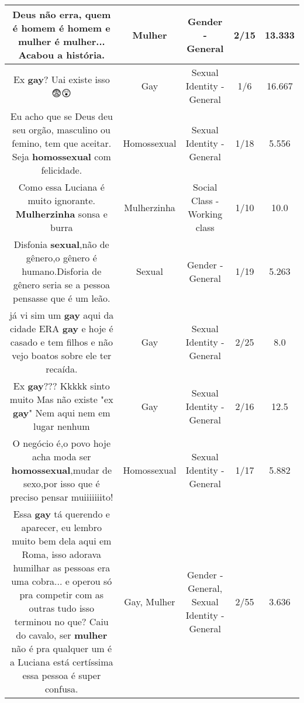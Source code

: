 \documentclass[11pt]{article}
\newlength\mylength
\begin{document}
\begin{center}
\begin{longtable}{|C{.65\mylength}|C{.30\mylength}|C{.12\mylength}|C{.12\mylength}|C{.12\mylength}|}
  \small Deus não erra, quem é homem é homem e \textbf{mulher} é \textbf{mulher}... Acabou a história.\normalsize   & Mulher & Gender - General & 2/15 & 13.333 \\  \hline
  \small Ex \textbf{gay}? Uai existe isso 😨😲\normalsize   & Gay & Sexual Identity - General & 1/6 & 16.667 \\  \hline
  \small Eu acho que se Deus deu seu orgão, masculino ou femino, tem que aceitar. Seja \textbf{homossexual} com felicidade.\normalsize   & Homossexual & Sexual Identity - General & 1/18 & 5.556 \\  \hline
  \small Como essa Luciana é muito ignorante.  \textbf{Mulherzinha} sonsa e burra\normalsize   & Mulherzinha & Social Class - Working class & 1/10 & 10.0 \\  \hline
  \small Disfonia \textbf{sexual},não de gênero,o gênero é humano.Disforia de gênero seria se a pessoa pensasse que é um leão.\normalsize   & Sexual & Gender - General & 1/19 & 5.263 \\  \hline
  \small já vi sim um \textbf{gay} aqui da cidade ERA \textbf{gay} e hoje é casado e tem filhos e não vejo boatos sobre ele ter recaída.\normalsize   & Gay & Sexual Identity - General & 2/25 & 8.0 \\  \hline
  \small Ex \textbf{gay}??? Kkkkk sinto muito Mas não existe "ex \textbf{gay}" Nem aqui nem em lugar nenhum\normalsize   & Gay & Sexual Identity - General & 2/16 & 12.5 \\  \hline
  \small O negócio é,o povo hoje acha moda ser \textbf{homossexual},mudar de sexo,por isso que é preciso pensar muiiiiiiito!\normalsize   & Homossexual & Sexual Identity - General & 1/17 & 5.882 \\  \hline
  \small Essa \textbf{gay} tá querendo e aparecer, eu lembro muito bem dela aqui em Roma, isso adorava humilhar as pessoas era uma cobra... e operou só pra competir com as outras tudo isso terminou no que? Caiu do cavalo, ser \textbf{mulher} não é pra qualquer um é a Luciana está certíssima essa pessoa é super confusa.\normalsize   & Gay, Mulher & Gender - General, Sexual Identity - General & 2/55 & 3.636 \\  \hline

\end{longtable}
\end{center}
\end{document}
